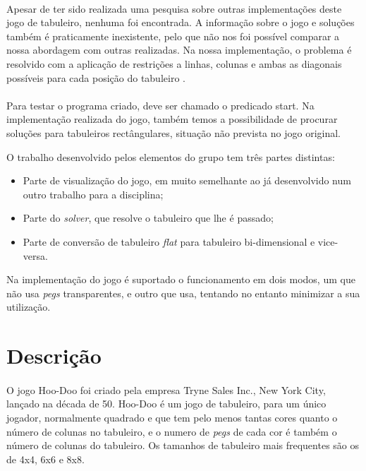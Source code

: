 \documentclass{llncs}
\begin{document}
\paragraph*{}
Apesar de ter sido realizada uma pesquisa sobre outras implementa\c{c}\~{o}es deste jogo de tabuleiro, nenhuma foi encontrada. A informa\c{c}\~{a}o sobre o jogo e solu\c{c}\~{o}es tamb\'{e}m \'{e} praticamente inexistente, pelo que n\~{a}o nos foi poss\'{i}vel comparar a nossa abordagem com outras realizadas. Na nossa implementa\c{c}\~{a}o, o problema \'{e} resolvido com a aplica\c{c}\~{a}o de restri\c{c}\~{o}es a linhas, colunas e ambas as diagonais poss\'{i}veis para cada posi\c{c}\~{a}o do tabuleiro .
\paragraph*{}
Para testar o programa criado, deve ser chamado o predicado start. Na implementa\c{c}\~{a}o realizada do jogo, tamb\'{e}m temos a possibilidade de procurar solu\c{c}\~{o}es para tabuleiros rect\^{a}ngulares, situa\c{c}\~{a}o n\~{a}o prevista no jogo original.
 
O trabalho desenvolvido pelos elementos do grupo tem tr\^{e}s partes distintas:
\begin{itemize}
\item Parte de visualiza\c{c}\~{a}o do jogo, em muito semelhante ao j\'{a} desenvolvido num outro trabalho para a disciplina;
\item Parte do \emph{solver}, que resolve o tabuleiro que lhe \'{e} passado;
\item Parte de convers\~{a}o de tabuleiro \emph{flat} para tabuleiro bi-dimensional e vice-versa.
\end{itemize}

Na implementa\c{c}\~{a}o do jogo \'{e} suportado o funcionamento em dois modos, um que n\~{a}o usa \emph{pegs} transparentes, e outro que usa, tentando no entanto minimizar a sua utiliza\c{c}\~{a}o.

%

\section{Descri\c{c}\~{a}o}
%
\paragraph*{}
O jogo Hoo-Doo foi criado pela empresa Tryne Sales Inc., New York City, lan\c{c}ado na d\'{e}cada de 50. Hoo-Doo \'{e} um jogo de tabuleiro, para um \'{u}nico jogador, normalmente quadrado e que tem pelo menos tantas cores quanto o n\'{u}mero de colunas no tabuleiro, e o numero de \emph{\emph{pegs}} de cada cor  \'{e} tamb\'{e}m o n\'{u}mero de colunas do tabuleiro. Os tamanhos de tabuleiro mais frequentes s\~{a}o os de 4x4, 6x6 e 8x8.
\end{document}
